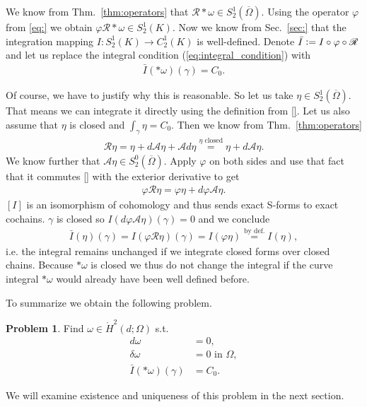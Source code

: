 \documentclass[12pt,a4paper]{article}
\numberwithin{equation}{subsection}
\numberwithin{lemma}{subsection}
\theoremstyle{definition}
\newtheorem{problem}[lemma]{Problem}
\newcommand{\aop}{\mathscr{A}}
\newcommand{\omegabar}{\overline{\Omega}}
\newcommand{\rop}{\mathscr{R}} %
\begin{document}
We know from Thm.~\ref{thm:operators} that $\rop *\omega \in S^1_2(\omegabar)$.
Using the operator $\varphi$ from \ref{eq:} we obtain 
$\varphi \rop *\omega \in S^1_2(K)$. Now we know from Sec.~\ref{sec:} that 
the integration mapping $I: S^1_2(K) \rightarrow C^1_2(K)$ is well-defined.
Denote $\bar{I} \vcentcolon= I\circ \varphi \circ \rop$ and 
let us replace the integral condition (\ref{eq:integral_condition}) with 
\begin{align*}
    \bar{I}(*\omega)(\gamma) = C_0.
\end{align*}

Of course, we have to justify why this is reasonable. 
So let us take $\eta \in S^1_2(\omegabar)$. That means we can integrate it 
directly using the definition from \ref{}. 
Let us also assume that $\eta$ is closed and 
$\int_\gamma \eta = C_0$. %
Then we know from Thm.~\ref{thm:operators}
\begin{align*}
    \rop \eta = \eta + d\aop \eta + \aop d\eta 
    \stackrel{\eta \text{ closed}}{=} \eta + d\aop \eta.
\end{align*}
We know further that $\aop \eta \in S^0_2(\omegabar)$. 
Apply $\varphi$ on both sides and use that fact that it commutes 
\ref{} with the 
exterior derivative to get
\begin{align*}
    \varphi \rop \eta = \varphi\eta + d \varphi\aop \eta.
\end{align*}
$[I]$ is an isomorphism of cohomology and thus sends exact S-forms to exact 
cochains. $\gamma$ is closed so $I(d \varphi\aop \eta)(\gamma) = 0$ and 
we conclude 
\begin{align*}
    \bar{I}(\eta)(\gamma) = I(\varphi \rop \eta)(\gamma) = I(\varphi \eta)
    \stackrel{\text{by def.}}{=} I(\eta),
\end{align*}
i.e. the integral remains unchanged if we integrate closed forms over 
closed chains. Because $*\omega$ is closed we thus do not change the integral 
if the curve integral $*\omega$ would already have been well defined before.

To summarize we obtain the following problem.
\begin{problem}
    Find $\omega \in \mathring{H}^2(d;\Omega)$ s.t.
    \begin{align*}
        d \omega &= 0, \\
        \delta \omega &= 0 \text{ in $\Omega$}, \\
        \bar{I}(*\omega)(\gamma)  &= C_0.
    \end{align*}
\end{problem}
\noindent We will examine existence and 
uniqueness of this problem in the next section.
\end{document}
